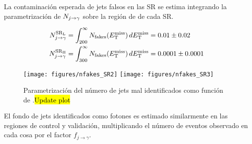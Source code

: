 La contaminación esperada de jets falsos en las SR se estima integrando la
parametrización de $N_{j\rightarrow\gamma}$ sobre la región de {\met} de cada SR.

\begin{align}
  N_{j\rightarrow\gamma}^\text{\ensuremath{\mathrm{SR}_\mathrm{L}}} &= \int_{200}^{\infty} N_\text{fakes}(E_{\mathrm{T}}^{\mathrm{miss}}) \, dE_{\mathrm{T}}^{\mathrm{miss}} = 0.01 \pm 0.02 \\
  N_{j\rightarrow\gamma}^\text{\ensuremath{\mathrm{SR}_\mathrm{H}}} &= \int_{300}^{\infty} N_\text{fakes}(E_{\mathrm{T}}^{\mathrm{miss}}) \, dE_{\mathrm{T}}^{\mathrm{miss}} = 0.0001 \pm 0.0001
\end{align}


\begin{figure}[!htbp]
  \centering
  \texttt{[image: figures/nfakes\_SR2]}  \hfill
  \texttt{[image: figures/nfakes\_SR3]}
  \caption{Parametrización del número de jets mal identificados como
    función de {\met}.\hl{Update plot}}
  \label{fig:jetfake_nfakes_met}
\end{figure}

El fondo de jets identificados como fotones es estimado similarmente en las
regiones de control y validación,
multiplicando el número de eventos observado en cada cosa por el factor
$f_{j\to\gamma}$.









